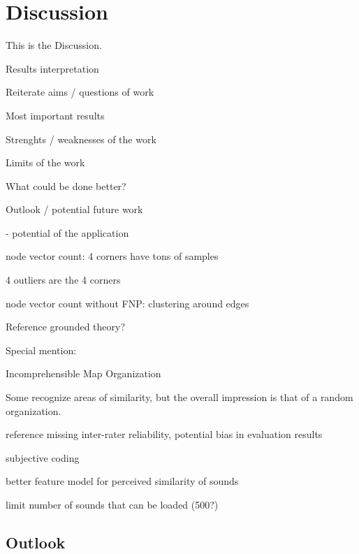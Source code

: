 
\section{Discussion}
\label{sec:discussion}
This is the Discussion.

Results interpretation




Reiterate aims / questions of work



Most important results



Strenghts / weaknesses of the work



Limits of the work



What could be done better?



Outlook / potential future work

- potential of the application






node vector count: 4 corners have tons of samples

4 outliers are the 4 corners

node vector count without FNP: clustering around edges

Reference grounded theory?

Special mention:

Incomprehensible Map Organization

Some recognize areas of similarity, but the overall impression is that of a
random organization.


reference missing inter-rater reliability,
potential bias in evaluation results

subjective coding

better feature model for perceived similarity of sounds

limit number of sounds that can be loaded (500?)



\subsection{Outlook}
\label{subsec:outlook}
